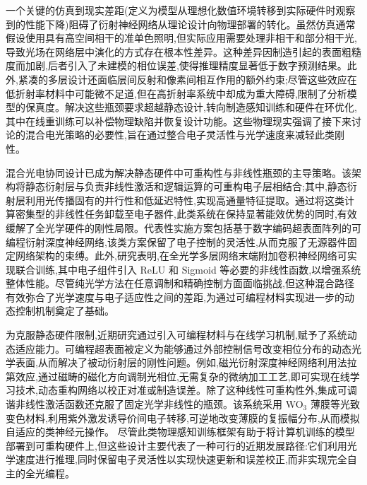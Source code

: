 \documentclass[11pt]{article}
\begin{document}
一个关键的仿真到现实差距(定义为模型从理想化数值环境转移到实际硬件时观察到的性能下降)阻碍了衍射神经网络从理论设计向物理部署的转化。虽然仿真通常假设使用具有高空间相干的准单色照明,但实际应用需要处理非相干和部分相干光,导致光场在网络层中演化的方式存在根本性差异。\citep{doi_10_1364_oe_523619_ddeb1b53}这种差异因制造引起的表面粗糙度而加剧,后者引入了未建模的相位误差,使得推理精度显著低于数字预测结果。此外,紧凑的多层设计还面临层间反射和像素间相互作用的额外约束;尽管这些效应在低折射率材料中可能微不足道,但在高折射率系统中却成为重大障碍,限制了分析模型的保真度。解决这些瓶颈要求超越静态设计,转向制造感知训练和硬件在环优化,其中在线重训练可以补偿物理缺陷并恢复设计功能。这些物理现实强调了接下来讨论的混合电光策略的必要性,旨在通过整合电子灵活性与光学速度来减轻此类刚性。\citep{doi_10_1038_s41598_025_19638_8_1b2db1c9} \citep{doi_10_1364_oe_523619_ddeb1b53} \citep{doi_10_1109_dac56929_2023_10247715_f78d6713} \citep{doi_10_1364_ol_477605_b9242e3a}

混合光电协同设计已成为解决静态硬件中可重构性与非线性瓶颈的主导策略。该架构将静态衍射层与负责非线性激活和逻辑运算的可重构电子层相结合;其中,静态衍射层利用光传播固有的并行性和低延迟特性,实现高通量特征提取。通过将这类计算密集型的非线性任务卸载至电子器件,此类系统在保持显著能效优势的同时,有效缓解了全光学硬件的刚性局限。代表性实施方案包括基于数字编码超表面阵列的可编程衍射深度神经网络,该类方案保留了电子控制的灵活性,从而克服了无源器件固定网络架构的束缚。此外,研究表明,在全光学多层网络末端附加卷积神经网络可实现联合训练,其中电子组件引入 ReLU 和 Sigmoid 等必要的非线性函数,以增强系统整体性能。尽管纯光学方法在任意调制和精确控制方面面临挑战,但这种混合路径有效弥合了光学速度与电子适应性之间的差距,为通过可编程材料实现进一步的动态控制机制奠定了基础。\citep{doi_10_1038_s41928_022_00719_9_a2169947} \citep{doi_10_3390_nano14221812_4d7d91b1} \citep{doi_10_1038_s41928_022_00719_9_a2169947} \citep{doi_10_1126_sciadv_adu0904_786138ff}

为克服静态硬件限制,近期研究通过引入可编程材料与在线学习机制,赋予了系统动态适应能力。可编程超表面被定义为能够通过外部控制信号改变相位分布的动态光学表面,从而解决了被动衍射层的刚性问题。例如,磁光衍射深度神经网络利用法拉第效应,通过磁畴的磁化方向调制光相位,无需复杂的微纳加工工艺,即可实现在线学习技术,动态重构网络以校正对准或制造误差。除了这种线性可重构性外,集成可调谐非线性激活函数还克服了固定光学非线性的瓶颈。该系统采用 WO\(_{3}\) 薄膜等光致变色材料,利用紫外激发诱导价间电子转移,可逆地改变薄膜的复振幅分布,从而模拟自适应的类神经元操作。\citep{doi_10_1002_lpor_202500558_72fd7a4f} 尽管此类物理感知训练框架有助于将计算机训练的模型部署到可重构硬件上,但这些设计主要代表了一种可行的近期发展路径:它们利用光学速度进行推理,同时保留电子灵活性以实现快速更新和误差校正,而非实现完全自主的全光编程。\citep{s2_44f5e5b7573063092084a20caab78ea8a4e2407e_dd441649} \citep{doi_10_1002_lpor_202500558_72fd7a4f} \citep{doi_10_1002_lpor_202200348_d54cae18}
\end{document}
